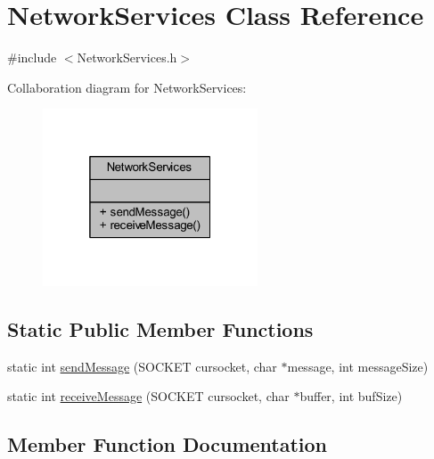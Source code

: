 \hypertarget{class_network_services}{}\section{Network\+Services Class Reference}
\label{class_network_services}


{\ttfamily \#include $<$Network\+Services.\+h$>$}



Collaboration diagram for Network\+Services\+:
\nopagebreak
\begin{figure}[H]
\begin{center}
\leavevmode
\includegraphics[width=181pt]{class_network_services__coll__graph}
\end{center}
\end{figure}
\subsection*{Static Public Member Functions}
\begin{DoxyCompactItemize}
\item 
static int \mbox{\hyperlink{class_network_services_aecc2718ec3bbea2b6a3b309a305295d7}{send\+Message}} (S\+O\+C\+K\+ET cursocket, char $\ast$message, int message\+Size)
\item 
static int \mbox{\hyperlink{class_network_services_a91eb95e2b42c6ec05f7cf6a6365045be}{receive\+Message}} (S\+O\+C\+K\+ET cursocket, char $\ast$buffer, int buf\+Size)
\end{DoxyCompactItemize}


\subsection{Member Function Documentation}
\mbox{\label{class_network_services_a91eb95e2b42c6ec05f7cf6a6365045be}} 
